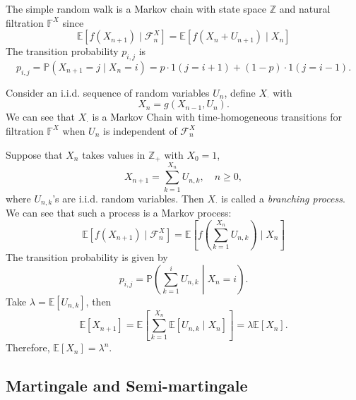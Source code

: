 \begin{example}
The simple random walk is a Markov chain with state space $\mathbb{Z}$ and natural filtration $\mathbb{F}^X$ since
\[
\mathbb{E}[f(X_{n+1})\mid\mathcal{F}_n^X] = \mathbb{E}[f(X_{n}+U_{n+1})\mid X_n]
\]
The transition probability $p_{i,j}$ is 
\[
p_{i,j} = \mathbb{P}(X_{n+1}=j\mid X_n=i) = p\cdot 1(j=i+1) + (1-p)\cdot 1(j=i-1).
\]
\end{example}

\begin{example}
Consider an i.i.d. sequence of random variables $U_n$, define $X_{\cdot}$ with
\[
X_n = g(X_{n-1},U_n).
\]
We can see that $X_{\cdot}$ is a Markov Chain with time-homogeneous transitions for filtration $\mathbb{F}^X$
when $U_n$ is independent of $\mathcal{F}_n^X$
\end{example}

\begin{example}
Suppose that $X_n$ takes values in $\mathbb{Z}_+$ with $X_0=1$, 
\[
X_{n+1} = \sum_{k=1}^{X_n}U_{n,k},\quad n\ge0,
\]
where $U_{n,k}$'s are i.i.d. random variables. 
Then $X_{\cdot}$ is called a \emph{branching process}.
We can see that such a process is a Markov process:
\[
\mathbb{E}[f(X_{n+1})\mid\mathcal{F}_n^X] = \mathbb{E}[f(\sum_{k=1}^{X_n}U_{n,k})\mid X_n]
\]
The transition probability is given by
\[
p_{i,j} = \mathbb{P}\left(
\sum_{k=1}^{i}U_{n,k}\middle| X_n=i
\right).
\]
Take $\lambda = \mathbb{E}[U_{n,k}]$, then
\[
\mathbb{E}[X_{n+1}]=\mathbb{E}[\sum_{k=1}^{X_n}\mathbb{E}[U_{n,k}\mid X_n]] = \lambda\mathbb{E}[X_{n}].
\]
Therefore, $\mathbb{E}[X_{n}]=\lambda^n$.
\end{example}

\subsection{Martingale and Semi-martingale}

